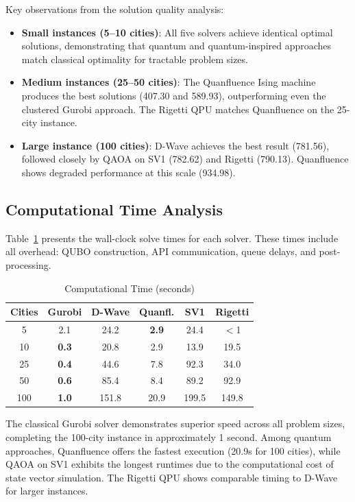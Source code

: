\documentclass[conference]{IEEEtran}
\begin{document}
Key observations from the solution quality analysis:

\begin{itemize}
\item \textbf{Small instances (5--10 cities)}: All five solvers achieve identical optimal solutions, demonstrating that quantum and quantum-inspired approaches match classical optimality for tractable problem sizes.
\item \textbf{Medium instances (25--50 cities)}: The Quanfluence Ising machine produces the best solutions (407.30 and 589.93), outperforming even the clustered Gurobi approach. The Rigetti QPU matches Quanfluence on the 25-city instance.
\item \textbf{Large instance (100 cities)}: D-Wave achieves the best result (781.56), followed closely by QAOA on SV1 (782.62) and Rigetti (790.13). Quanfluence shows degraded performance at this scale (934.98).
\end{itemize}

\subsection{Computational Time Analysis}

Table~\ref{tab:results_time} presents the wall-clock solve times for each solver. These times include all overhead: QUBO construction, API communication, queue delays, and post-processing.

\begin{table}[htbp]
\caption{Computational Time (seconds)}
\begin{center}
\begin{tabular}{|c|c|c|c|c|c|}
\hline
\textbf{Cities} & \textbf{Gurobi} & \textbf{D-Wave} & \textbf{Quanfl.} & \textbf{SV1} & \textbf{Rigetti} \\
\hline
5 & 2.1 & 24.2 & \textbf{2.9} & 24.4 & $<$1 \\
\hline
10 & \textbf{0.3} & 20.8 & 2.9 & 13.9 & 19.5 \\
\hline
25 & \textbf{0.4} & 44.6 & 7.8 & 92.3 & 34.0 \\
\hline
50 & \textbf{0.6} & 85.4 & 8.4 & 89.2 & 92.9 \\
\hline
100 & \textbf{1.0} & 151.8 & 20.9 & 199.5 & 149.8 \\
\hline
\end{tabular}
\label{tab:results_time}
\end{center}
\end{table}

The classical Gurobi solver demonstrates superior speed across all problem sizes, completing the 100-city instance in approximately 1 second. Among quantum approaches, Quanfluence offers the fastest execution (20.9s for 100 cities), while QAOA on SV1 exhibits the longest runtimes due to the computational cost of state vector simulation. The Rigetti QPU shows comparable timing to D-Wave for larger instances.
\end{document}
